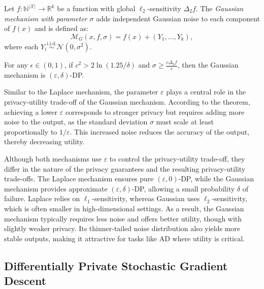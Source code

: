 \begin{definition}\label{def:gaussian}
Let $f : \mathbb{N}^{|\mathcal{X}|} \rightarrow \mathbb{R}^k$ be a function with global $\ell_2$-sensitivity $\Delta_2 f$. The \emph{Gaussian mechanism with parameter $\sigma$} adds independent Gaussian noise to each component of $f(x)$ and is defined as:
\[
\mathcal{M}_G(x, f, \sigma) = f(x) + (Y_1, \ldots, Y_k),
\]
where each $Y_i \overset{\text{i.i.d.}}{\sim} \mathcal{N}(0, \sigma^2)$.
\end{definition}
\begin{theorem}\label{the:gaussian_guarantee}
For any $\epsilon \in (0, 1)$, if $c^2 > 2 \ln(1.25/\delta)$ and $\sigma \geq \frac{c \Delta_2 f}{\varepsilon}$, then the Gaussian mechanism is $(\varepsilon, \delta)$-DP.
\end{theorem}

Similar to the Laplace mechanism, the parameter $\varepsilon$ plays a central role in the privacy-utility trade-off of the Gaussian mechanism. According to the theorem, achieving a lower $\varepsilon$ corresponds to stronger privacy but requires adding more noise to the output, as the standard deviation $\sigma$ must scale at least proportionally to $1/\varepsilon$. This increased noise reduces the accuracy of the output, thereby decreasing utility.

Although both mechanisms use $\varepsilon$ to control the privacy-utility trade-off, they differ in the nature of the privacy guarantees and the resulting privacy-utility trade-offs. The Laplace mechanism ensures pure $(\varepsilon, 0)$-DP, while the Gaussian mechanism provides approximate $(\varepsilon, \delta)$-DP, allowing a small probability $\delta$ of failure. Laplace relies on $\ell_1$-sensitivity, whereas Gaussian uses $\ell_2$-sensitivity, which is often smaller in high-dimensional settings. As a result, the Gaussian mechanism typically requires less noise and offers better utility, though with slightly weaker privacy. Its thinner-tailed noise distribution also yields more stable outputs, making it attractive for tasks like AD where utility is critical.

\subsection{Differentially Private Stochastic Gradient Descent}

